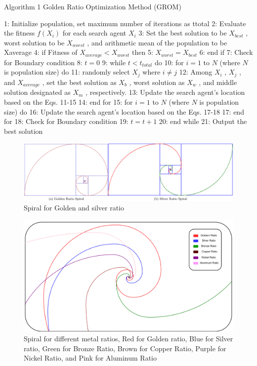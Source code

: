 Algorithm 1 Golden Ratio Optimization Method (GROM)

1: Initialize population, set maximum number of iterations as ttotal
2: Evaluate the fitness $f(X_{i})$ for each search agent $X_{i}$
3: Set the best solution to be $X_{b e s t}$ , worst solution to be $X_{w o r s t}$ , and arithmetic mean of the population to be Xaverage
4: if Fitness of $X_{a v e r a g e}<X_{w o r s t}$ then 5: $X_{w o r s t}=X_{b e s t}$
6: end if
7: Check for Boundary condition
8: $t=0$
9: while $t<t_{t o t a l}$ do
10: for $i=1$ to $N$ (where $N$ is population size) do
11: randomly select $X_{j}$ where $i\neq j$
12: Among $X_{i}$ , $X_{j}$ , and $X_{a v e r a g e}$ , set the best solution as $X_{b}$ , worst solution as $X_{w}$ , and middle solution designated as $X_{m}$ , respectively.
13: Update the search agent’s location based on the Eqs. 11-15
14: end for
15: for $i=1$ to $N$ (where $N$ is population size) do
16: Update the search agent’s location based on the Eqs. 17-18
17: end for
18: Check for Boundary condition
19: $t=t+1$
20: end while
21: Output the best solution

\begin{figure}[htbp]
\centering
\includegraphics[width=0.8\linewidth]{images/bef1348cf4a9ab99a10b9d5be522abd77b799e1481e3fd17b38e95198863349d.jpg}
\caption{Spiral for Golden and silver ratio}
\label{fig:3}
\end{figure}


\begin{figure}[htbp]
\centering
\includegraphics[width=0.8\linewidth]{images/7258b257b747e4edba10dd4428f923023f582f1b8071a2601126b0d487f027bf.jpg}
\caption{Spiral for different metal ratios, Red for Golden ratio, Blue for Silver ratio, Green for Bronze Ratio, Brown for Copper Ratio, Purple for Nickel Ratio, and Pink for Aluminum Ratio}
\label{fig:4}
\end{figure}


